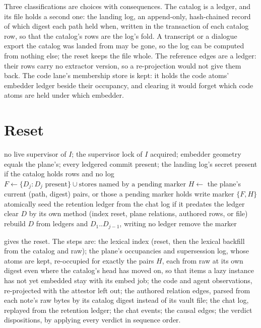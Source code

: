 \documentclass[11pt]{article}
\theoremstyle{plain}
\theoremstyle{definition}
\theoremstyle{remark}
\begin{document}
Three classifications are choices with consequences. The catalog is a ledger, and its file holds
a second one: the landing log, an append-only, hash-chained record of which digest each path held
when, written in the transaction of each catalog row, so that the catalog's rows are the log's
fold. A transcript or a dialogue export the catalog was landed from may be gone, so the log can be
computed from nothing else; the reset keeps the file whole. The reference edges are a ledger: their
rows carry no extractor version, so a re-projection would not give them back. The code lane's
membership store is kept: it holds the code atoms' embedder ledger beside their occupancy, and
clearing it would forget which code atoms are held under which embedder.

\section{Reset}\label{sec:reset}

\begin{algorithm}[t]
\caption{Reset of an instance $I$ with derived stores $D_1,\dots,D_k$ in rebuild order.}
\label{alg:reset}
\begin{algorithmic}[1]
\Require no live supervisor of $I$; the supervisor lock of $I$ acquired; embedder geometry equals the plane's; every ledgered commit present; the landing log's secret present if the catalog holds rows and no log
\State $F \gets \{D_j : D_j \text{ present}\} \cup \text{stores named by a pending marker}$
\State $H \gets$ the plane's current (path, digest) pairs, or those a pending marker holds
\State write marker $\{F, H\}$ atomically
\State seed the retention ledger from the chat log if it predates the ledger
 \State clear $D$ by its own method (index reset, plane relations, authored rows, or file)
\EndFor
{} \State rebuild $D$ from ledgers and $D_1..D_{j-1}$, writing no ledger
\EndFor
\State remove the marker
\end{algorithmic}
\end{algorithm}

 gives the reset. The steps are: the lexical index (reset, then the lexical
backfill from the catalog and raw); the plane's occupancies and supersession log, whose atoms are
kept, re-occupied for exactly the pairs $H$, each from raw at its own digest even where the
catalog's head has moved on, so that items a lazy instance has not yet embedded stay with its
embed job; the code and agent observations, re-projected with the attestor left out; the authored
relation edges, parsed from each note's raw bytes by its catalog digest instead of its vault file;
the chat log, replayed from the retention ledger; the chat events; the causal edges; the verdict
dispositions, by applying every verdict in sequence order.
\end{document}
